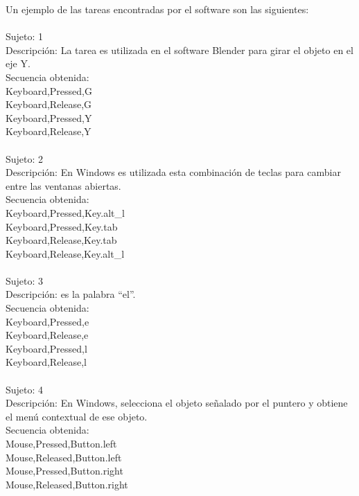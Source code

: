 Un ejemplo de las tareas encontradas por el software son las siguientes:
\\
\\
Sujeto: 1	\\
Descripci\'on: La tarea es utilizada en el software Blender para girar el objeto en el eje Y.	\\
Secuencia obtenida:\\
Keyboard,Pressed,G\\
Keyboard,Release,G\\
Keyboard,Pressed,Y\\
Keyboard,Release,Y\\
\\
Sujeto: 2	\\
Descripci\'on: En Windows es utilizada esta combinaci\'on de teclas para cambiar entre las ventanas abiertas.	\\
Secuencia obtenida:\\
Keyboard,Pressed,Key.alt\_l	\\
Keyboard,Pressed,Key.tab	\\
Keyboard,Release,Key.tab	\\
Keyboard,Release,Key.alt\_l	\\
\\
Sujeto: 3	\\
Descripci\'on: es la palabra ``el''.	\\
Secuencia obtenida:\\
Keyboard,Pressed,e	\\
Keyboard,Release,e	\\
Keyboard,Pressed,l	\\
Keyboard,Release,l	\\
\\
Sujeto: 4	\\
Descripci\'on: En Windows, selecciona el objeto se\~nalado por el puntero y obtiene el men\'u contextual de ese objeto.	\\
Secuencia obtenida:\\	
Mouse,Pressed,Button.left	\\
Mouse,Released,Button.left	\\
Mouse,Pressed,Button.right	\\
Mouse,Released,Button.right	\\
